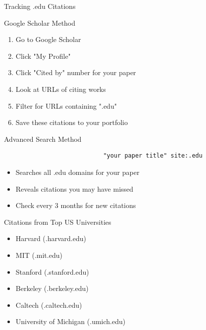 \documentclass[11pt]{beamer}
\begin{document}
				\begin{frame}{Tracking .edu Citations}
					\scriptsize
					\begin{block}{Google Scholar Method}
						\begin{enumerate}
							\item Go to Google Scholar
							\item Click "My Profile"
							\item Click "Cited by" number for your paper
							\item Look at URLs of citing works
							\item Filter for URLs containing ".edu"
							\item Save these citations to your portfolio
						\end{enumerate}
					\end{block}
					\begin{block}{Advanced Search Method}
						\begin{verbatim}
							"your paper title" site:.edu
						\end{verbatim}
						\begin{itemize}
							\item Searches all .edu domains for your paper
							\item Reveals citations you may have missed
							\item Check every 3 months for new citations
						\end{itemize}
					\end{block}
					\begin{block}{Citations from Top US Universities}
						\begin{itemize}
							\item Harvard (.harvard.edu)
							\item MIT (.mit.edu)
							\item Stanford (.stanford.edu)
							\item Berkeley (.berkeley.edu)
							\item Caltech (.caltech.edu)
							\item University of Michigan (.umich.edu)
						\end{itemize}
					\end{block}
				\end{frame}
				
\end{document}
